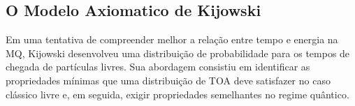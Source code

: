 



\subsection{O Modelo Axiomatico de Kijowski}
\label{sub:kijows}

Em uma tentativa de compreender melhor a relação entre tempo e energia na MQ, Kijowski \cite{Kijo} desenvolveu uma distribuição de probabilidade para os tempos de chegada de partículas livres. Sua abordagem consistiu em identificar as propriedades mínimas que uma distribuição de TOA deve satisfazer no caso clássico livre e, em seguida, exigir propriedades semelhantes no regime quântico. 


